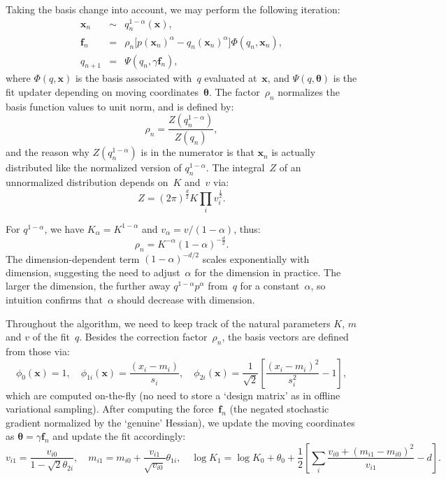 \documentclass{article}
\def\x{\mathbf{x}}
\def\th{{\boldsymbol{\theta}}}
\def\f{\mathbf{f}}
\begin{document}
Taking the basis change into account, we may perform the following iteration:
\begin{eqnarray*}
\x_n & \sim & q_n^{1-\alpha}(\x),\\
\f_n & = & \rho_n \big[p(\x_n)^\alpha - q_n(\x_n)^\alpha \big] \Phi(q_n, \x_n),\\
q_{n+1} & = & \Psi(q_n, \gamma \f_n),
\end{eqnarray*}
where $\Phi(q,\x)$ is the basis associated with~$q$ evaluated at~$\x$, and $\Psi(q,\th)$ is the fit updater depending on moving coordinates~$\th$. The factor~$\rho_n$ normalizes the basis function values to unit norm, and is defined by:
$$
\rho_n
= \frac{Z(q_n^{1-\alpha})}{Z(q_n)},
$$
and the reason why $Z(q_n^{1-\alpha})$ is in the numerator is that $\x_n$ is actually distributed like the normalized version of $q_n^{1-\alpha}$. The integral~$Z$ of an unnormalized distribution depends on~$K$ and~$v$ via: 
$$
Z = (2\pi)^\frac{d}{2} K  \prod_i v_i^\frac{1}{2}.
$$

For $q^{1-\alpha}$, we have $K_\alpha = K^{1-\alpha}$ and $v_\alpha=v/(1-\alpha)$, thus:
$$
\rho_n = K^{-\alpha} (1-\alpha)^{-\frac{d}{2}}.
$$
The dimension-dependent term $(1-\alpha)^{-d/2}$ scales exponentially with dimension, suggesting the need to adjust~$\alpha$ for the dimension in practice. The larger the dimension, the further away $q^{1-\alpha}p^\alpha$ from~$q$ for a constant~$\alpha$, so intuition confirms that~$\alpha$ should decrease with dimension.

Throughout the algorithm, we need to keep track of the natural parameters $K$, $m$ and $v$ of the fit~$q$. Besides the correction factor~$\rho_n$, the basis vectors are defined from those via:
$$
\phi_0(\x) = 1, 
\quad
\phi_{1i}(\x) = \frac{(x_i-m_i)}{s_i},
\quad
\phi_{2i}(\x) = \frac{1}{\sqrt{2}}\left[\frac{(x_i-m_i)^2}{s_i^2} - 1\right],
$$
which are computed on-the-fly (no need to store a `design matrix' as in offline variational sampling). After computing the force~$\f_n$ (the negated stochastic gradient normalized by the `genuine' Hessian), we update the moving coordinates as $\th=\gamma \f_n$ and update the fit accordingly:
$$
v_{i1} =  \frac{v_{i0}}{1-\sqrt{2}\theta_{2i}},
\quad
m_{i1} = m_{i0} + \frac{v_{i1}}{\sqrt{v_{i0}}} \theta_{1i},
\quad
\log K_1 = \log K_0 + \theta_0 + \frac{1}{2} \left[\sum_i \frac{v_{i0} + (m_{i1}-m_{i0})^2}{v_{i1}} - d\right].
$$

\end{document}
